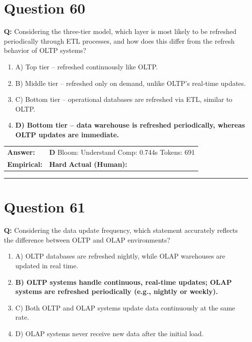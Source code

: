 \documentclass[9pt]{article}
\begin{document}
\section*{Question 60}

\textbf{Q:} Considering the three‑tier model, which layer is most likely to be refreshed periodically through ETL processes, and how does this differ from the refresh behavior of OLTP systems?

\begin{enumerate}[label=\textbf{\alph{*})}, nosep]
    \item A) Top tier – refreshed continuously like OLTP.
    \item B) Middle tier – refreshed only on demand, unlike OLTP’s real‑time updates.
    \item C) Bottom tier – operational databases are refreshed via ETL, similar to OLTP.
    \item \textbf{D) Bottom tier – data warehouse is refreshed periodically, whereas OLTP updates are immediate.} %

\end{enumerate}

\begin{tabular}{@{}l p{10.5cm}@{}}
\textbf{Answer:} & \textbf{D} \hspace{1em} Bloom: Understand \hspace{1em} Comp: 0.744s \hspace{1em} Tokens: 691 \\
\textbf{Empirical:} & \textbf{Hard} \hspace{1em} \textbf{Actual (Human):} \underline{\hspace{5cm}}
\end{tabular}

\vspace{0.2cm}
\rule{\textwidth}{0.4pt}
\vspace{0.2cm}


\section*{Question 61}

\textbf{Q:} Considering the data update frequency, which statement accurately reflects the difference between OLTP and OLAP environments?

\begin{enumerate}[label=\textbf{\alph{*})}, nosep]
    \item A) OLTP databases are refreshed nightly, while OLAP warehouses are updated in real time.
    \item \textbf{B) OLTP systems handle continuous, real‑time updates; OLAP systems are refreshed periodically (e.g., nightly or weekly).} %
    \item C) Both OLTP and OLAP systems update data continuously at the same rate.
    \item D) OLAP systems never receive new data after the initial load.

\end{enumerate}
\end{document}
